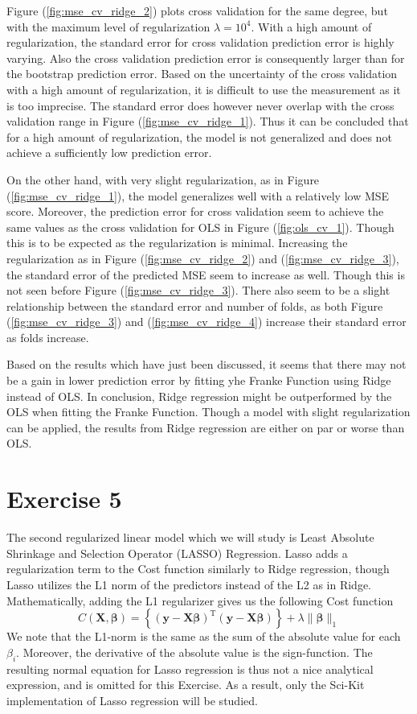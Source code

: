 \documentclass[11pt, a4paper]{article}
\begin{document}
Figure (\ref{fig:mse_cv_ridge_2}) plots cross validation for the same degree, but with the maximum level of regularization $\lambda = 10^4$. With a high amount of regularization, the standard error for cross validation prediction error is highly varying. Also the cross validation prediction error is consequently larger than for the bootstrap prediction error. Based on the uncertainty of the cross validation with a high amount of regularization, it is difficult to use the measurement as it is too imprecise. The standard error does however never overlap with the cross validation range in Figure (\ref{fig:mse_cv_ridge_1}). Thus it can be concluded that for a high amount of regularization, the model is not generalized and does not achieve a sufficiently low prediction error. 

On the other hand, with very slight regularization, as in Figure (\ref{fig:mse_cv_ridge_1}), the model generalizes well with a relatively low MSE score. Moreover, the prediction error for cross validation seem to achieve the same values as the cross validation for OLS in Figure (\ref{fig:ols_cv_1}). Though this is to be expected as the regularization is minimal. Increasing the regularization as in Figure (\ref{fig:mse_cv_ridge_2}) and (\ref{fig:mse_cv_ridge_3}), the standard error of the predicted MSE seem to increase as well. Though this is not seen before Figure (\ref{fig:mse_cv_ridge_3}). There also seem to be a slight relationship between the standard error and number of folds, as both Figure (\ref{fig:mse_cv_ridge_3}) and (\ref{fig:mse_cv_ridge_4}) increase their standard error as folds increase.

Based on the results which have just been discussed, it seems that there may not be a gain in lower prediction error by fitting yhe Franke Function using Ridge instead of OLS. In conclusion, Ridge regression might be outperformed by the OLS when fitting the Franke Function. Though a model with slight regularization can be applied, the results from Ridge regression are either on par or worse than OLS. 

\section*{Exercise 5}
The second regularized linear model which we will study is Least Absolute Shrinkage and Selection Operator (LASSO) Regression. Lasso adds a regularization term to the Cost function similarly to Ridge regression, though Lasso utilizes the L1 norm of the predictors instead of the L2 as in Ridge. \cite{Geron2019} Mathematically, adding the L1 regularizer gives us the following Cost function
\[
  C\left(\bm{X},\bm{\beta}\right) = \left\{\left(\bm{y}-\bm{X}\bm{\beta}\right)^\text{T}\left(\bm{y}-\bm{X}\bm{\beta}\right)\right\}+\lambda\lVert \bm{\beta}\rVert_1
\]
We note that the L1-norm is the same as the sum of the absolute value for each $\beta_i$. Moreover, the derivative of the absolute value is the sign-function. The resulting normal equation for Lasso regression is thus not a nice analytical expression, and is omitted for this Exercise. As a result, only the Sci-Kit implementation of Lasso regression will be studied.
\end{document}
